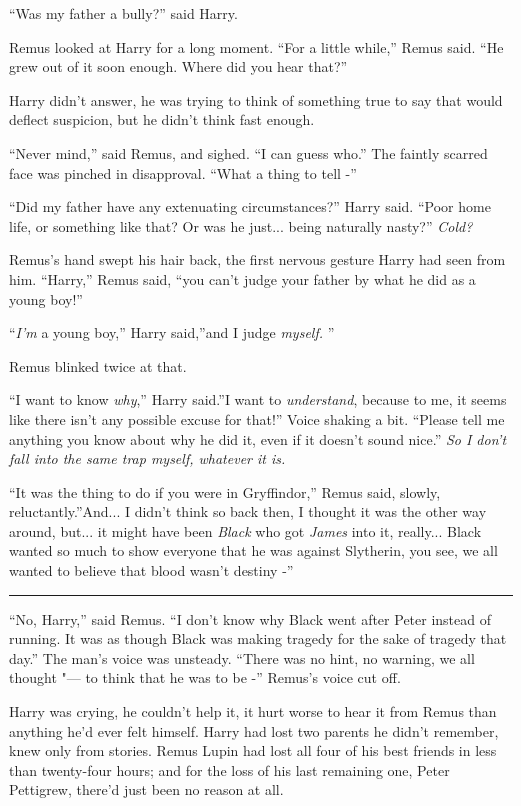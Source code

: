 ``Was my father a bully?'' said Harry.

Remus looked at Harry for a long moment. ``For a little while,'' Remus
said. ``He grew out of it soon enough. Where did you hear that?''

Harry didn't answer, he was trying to think of something true to say
that would deflect suspicion, but he didn't think fast enough.

``Never mind,'' said Remus, and sighed. ``I can guess who.'' The faintly
scarred face was pinched in disapproval. ``What a thing to tell -''

``Did my father have any extenuating circumstances?'' Harry said. ``Poor
home life, or something like that? Or was he just... being
naturally nasty?'' \emph{Cold?}

Remus's hand swept his hair back, the first nervous gesture Harry had
seen from him. ``Harry,'' Remus said, ``you can't judge your father by
what he did as a young boy!''

``\emph{I'm} a young boy,'' Harry said,''and I judge \emph{myself.} ''

Remus blinked twice at that.

``I want to know \emph{why},'' Harry said.''I want to \emph{understand},
because to me, it seems like there isn't any possible excuse for that!''
Voice shaking a bit. ``Please tell me anything you know about why he did
it, even if it doesn't sound nice.'' \emph{So I don't fall into the same
trap myself, whatever it is.}

``It was the thing to do if you were in Gryffindor,'' Remus said,
slowly, reluctantly.''And... I didn't think so back then, I thought
it was the other way around, but... it might have been \emph{Black}
who got \emph{James} into it, really... Black wanted so much to
show everyone that he was against Slytherin, you see, we all wanted to
believe that blood wasn't destiny -''

\begin{center}\rule{3in}{0.4pt}\end{center}

``No, Harry,'' said Remus. ``I don't know why Black went after Peter
instead of running. It was as though Black was making tragedy for the
sake of tragedy that day.'' The man's voice was unsteady. ``There was no
hint, no warning, we all thought "--- to think that he was to be -''
Remus's voice cut off.

Harry was crying, he couldn't help it, it hurt worse to hear it from
Remus than anything he'd ever felt himself. Harry had lost two parents
he didn't remember, knew only from stories. Remus Lupin had lost all
four of his best friends in less than twenty-four hours; and for the
loss of his last remaining one, Peter Pettigrew, there'd just been no
reason at all.

